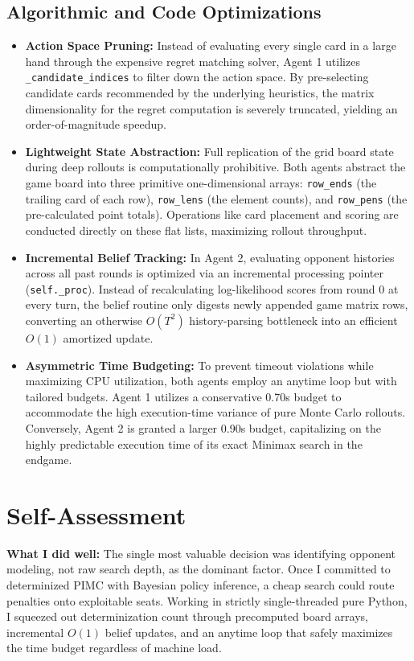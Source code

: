 \documentclass{article}
\begin{document}
\subsection{Algorithmic and Code Optimizations}


\begin{itemize}
    \item \textbf{Action Space Pruning:} Instead of evaluating every single card in a large hand through the expensive regret matching solver, Agent 1 utilizes \texttt{\_candidate\_indices} to filter down the action space. By pre-selecting candidate cards recommended by the underlying heuristics, the matrix dimensionality for the regret computation is severely truncated, yielding an order-of-magnitude speedup.
    \item \textbf{Lightweight State Abstraction:} Full replication of the grid board state during deep rollouts is computationally prohibitive. Both agents abstract the game board into three primitive one-dimensional arrays: \texttt{row\_ends} (the trailing card of each row), \texttt{row\_lens} (the element counts), and \texttt{row\_pens} (the pre-calculated point totals). Operations like card placement and scoring are conducted directly on these flat lists, maximizing rollout throughput.
    \item \textbf{Incremental Belief Tracking:} In Agent 2, evaluating opponent histories across all past rounds is optimized via an incremental processing pointer (\texttt{self.\_proc}). Instead of recalculating log-likelihood scores from round $0$ at every turn, the belief routine only digests newly appended game matrix rows, converting an otherwise $O(T^2)$ history-parsing bottleneck into an efficient $O(1)$ amortized update.
    \item \textbf{Asymmetric Time Budgeting:} To prevent timeout violations while maximizing CPU utilization, both agents employ an anytime loop but with tailored budgets. Agent 1 utilizes a conservative 0.70s budget to accommodate the high execution-time variance of pure Monte Carlo rollouts. Conversely, Agent 2 is granted a larger 0.90s budget, capitalizing on the highly predictable execution time of its exact Minimax search in the endgame.
\end{itemize}

\section{Self-Assessment}
\textbf{What I did well:} The single most valuable decision was identifying opponent modeling, not raw search depth, as the dominant factor. Once I committed to determinized PIMC with Bayesian policy inference, a cheap search could route penalties onto exploitable seats. Working in strictly single-threaded pure Python, I squeezed out determinization count through precomputed board arrays, incremental $O(1)$ belief updates, and an anytime loop that safely maximizes the time budget regardless of machine load.
\end{document}
